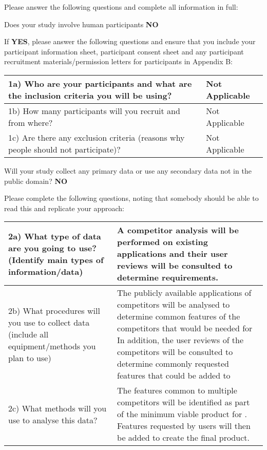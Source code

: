\documentclass[../CHEFCookingHelperForEveryonesFridge.tex]{subfiles}
\begin{document}
Please answer the following questions and complete all information in full:

Does your study involve human participants \textbf{NO}


If \textbf{YES}, please answer the following questions and ensure that you include your participant
information sheet, participant consent sheet and any participant recruitment materials/permission
letters for participants in Appendix B:

\begin{table}[H]
    \begin{tabulary}{\textwidth}{|L|L|}
        \hline
        1a) Who are your participants and what are the inclusion criteria you will be using? & Not Applicable \\\hline
        1b) How many participants will you recruit and from where? & Not Applicable \\\hline
        1c) Are there any exclusion criteria (reasons why people should not participate)? & Not Applicable \\\hline
    \end{tabulary}
\end{table}

Will your study collect any primary data or use any secondary data not in the public domain? \textbf{NO}

Please complete the following questions, noting that somebody should be able to read this and replicate your approach:

\begin{table}[H]
    \begin{tabulary}{\textwidth}{|L|L|}
        \hline
        2a) What type of data are you going to use? (Identify main types of information/data)
            &
        A competitor analysis will be performed on existing applications and their user reviews will be consulted to determine requirements.
            \\\hline
        2b) What procedures will you use to collect data (include all equipment/methods you plan to use)
            &
        The publicly available applications of competitors will be analysed to determine common features of the competitors that would be needed for \chef{}
        In addition, the user reviews of the competitors will be consulted to determine commonly requested features that could be added to \chef{}
            \\\hline
        2c) What methods will you use to analyse this data?
            &
        The features common to multiple competitors will be identified as part of the minimum viable product for \chef{}.
        Features requested by users will then be added to create the final product.
            \\\hline
    \end{tabulary}
\end{table}
\end{document}

